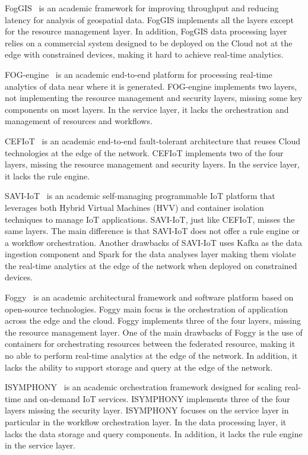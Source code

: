 FogGIS~\cite{7894725} is an academic framework for improving throughput and reducing latency for analysis of geospatial data. FogGIS implements all the layers except for the resource management layer. In addition, FogGIS data processing layer relies on a commercial system designed to be deployed on the Cloud not at the edge with constrained devices, making it hard to achieve real-time analytics.

FOG-engine~\cite{7588914} is an academic end-to-end platform for processing real-time analytics of data near where it is generated. FOG-engine implements two layers, not implementing the resource management and security layers, missing some key components on most layers. In the service layer, it lacks the orchestration and management of resources and workflows.

CEFIoT~\cite{8355149} is an academic end-to-end fault-tolerant architecture that reuses Cloud technologies at the edge of the network. CEFIoT implements two of the four layers, missing the resource management and security layers. In the service layer, it lacks the rule engine.

SAVI-IoT~\cite{8114487} is an academic self-managing programmable IoT platform that leverages both Hybrid Virtual Machines (HVV) and container isolation techniques to manage IoT applications. SAVI-IoT, just like CEFIoT, misses the same layers. The main difference is that SAVI-IoT does not offer a rule engine or a workflow orchestration. Another drawbacks of SAVI-IoT uses Kafka as the data ingestion component and Spark for the data analyses layer making them violate the real-time analytics at the edge of the network when deployed on constrained devices.

Foggy~\cite{8027267} is an academic architectural framework and software platform based on open-source technologies. Foggy main focus is the orchestration of application across the edge and the cloud. Foggy implements three of the four layers, missing the resource management layer. One of the main drawbacks of Foggy is the use of containers for orchestrating resources between the federated resource, making it no able to perform real-time analytics at the edge of the network. In addition, it lacks the ability to support storage and query at the edge of the network.

ISYMPHONY~\cite{8039055} is an academic orchestration framework designed for scaling real-time and on-demand IoT services. ISYMPHONY implements three of the four layers missing the security layer. ISYMPHONY focuses on the service layer in particular in the workflow orchestration layer. In the data processing layer, it lacks the data storage and query components. In addition, it lacks the rule engine in the service layer.

